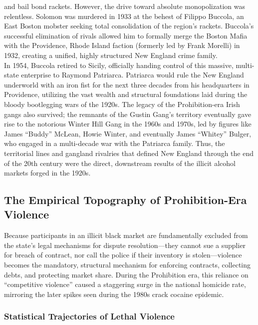 \documentclass[
]{article}
\begin{document}
and bail bond rackets. However, the drive toward absolute monopolization
was relentless. Solomon was murdered in 1933 at the behest of Filippo
Buccola, an East Boston mobster seeking total consolidation of the
region's rackets. Buccola's successful elimination of rivals allowed him
to formally merge the Boston Mafia with the Providence, Rhode Island
faction (formerly led by Frank Morelli) in 1932, creating a unified,
highly structured New England crime family.\\
In 1954, Buccola retired to Sicily, officially handing control of this
massive, multi-state enterprise to Raymond Patriarca. Patriarca would
rule the New England underworld with an iron fist for the next three
decades from his headquarters in Providence, utilizing the vast wealth
and structural foundations laid during the bloody bootlegging wars of
the 1920s. The legacy of the Prohibition-era Irish gangs also survived;
the remnants of the Gustin Gang's territory eventually gave rise to the
notorious Winter Hill Gang in the 1960s and 1970s, led by figures like
James ``Buddy'' McLean, Howie Winter, and eventually James ``Whitey''
Bulger, who engaged in a multi-decade war with the Patriarca family.
Thus, the territorial lines and gangland rivalries that defined New
England through the end of the 20th century were the direct, downstream
results of the illicit alcohol markets forged in the 1920s.

\subsection{\texorpdfstring{\textbf{The Empirical Topography of
Prohibition-Era
Violence}}{The Empirical Topography of Prohibition-Era Violence}}\label{the-empirical-topography-of-prohibition-era-violence}

Because participants in an illicit black market are fundamentally
excluded from the state's legal mechanisms for dispute resolution---they
cannot sue a supplier for breach of contract, nor call the police if
their inventory is stolen---violence becomes the mandatory, structural
mechanism for enforcing contracts, collecting debts, and protecting
market share. During the Prohibition era, this reliance on ``competitive
violence'' caused a staggering surge in the national homicide rate,
mirroring the later spikes seen during the 1980s crack cocaine epidemic.

\subsubsection{\texorpdfstring{\textbf{Statistical Trajectories of
Lethal
Violence}}{Statistical Trajectories of Lethal Violence}}\label{statistical-trajectories-of-lethal-violence}
\end{document}
